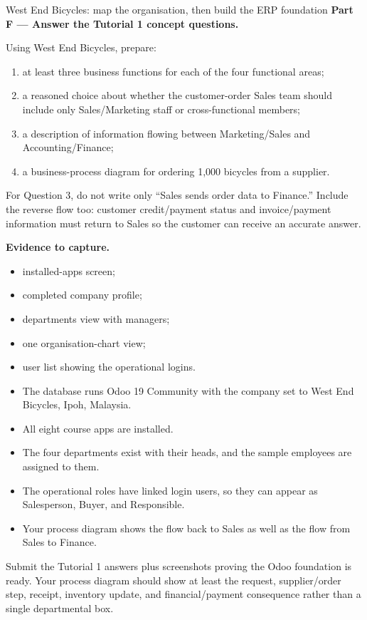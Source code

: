 \begin{labproject}{West End Bicycles: map the organisation, then build the ERP foundation}
\medskip\noindent\textbf{Part F --- Answer the Tutorial 1 concept questions.}

Using West End Bicycles, prepare:
\begin{enumerate}
  \item at least three business functions for each of the four functional areas;
  \item a reasoned choice about whether the customer-order Sales team should include only Sales/Marketing staff or cross-functional members;
  \item a description of information flowing between Marketing/Sales and Accounting/Finance;
  \item a business-process diagram for ordering 1,000 bicycles from a supplier.
\end{enumerate}

\begin{tryit}
For Question 3, do not write only ``Sales sends order data to Finance.'' Include the reverse flow too: customer credit/payment status and invoice/payment information must return to Sales so the customer can receive an accurate answer.
\end{tryit}

\medskip\noindent\textbf{Evidence to capture.}
\begin{itemize}
  \item installed-apps screen;
  \item completed company profile;
  \item departments view with managers;
  \item one organisation-chart view;
  \item user list showing the operational logins.
\end{itemize}
\end{labproject}

\begin{verification}
\begin{itemize}
  \item The database runs Odoo 19 Community with the company set to West End Bicycles, Ipoh, Malaysia.
  \item All eight course apps are installed.
  \item The four departments exist with their heads, and the sample employees are assigned to them.
  \item The operational roles have linked login users, so they can appear as Salesperson, Buyer, and Responsible.
  \item Your process diagram shows the flow back to Sales as well as the flow from Sales to Finance.
\end{itemize}
\end{verification}

\begin{labdeliverable}
Submit the Tutorial 1 answers plus screenshots proving the Odoo foundation is ready. Your process diagram should show at least the request, supplier/order step, receipt, inventory update, and financial/payment consequence rather than a single departmental box.
\end{labdeliverable}
